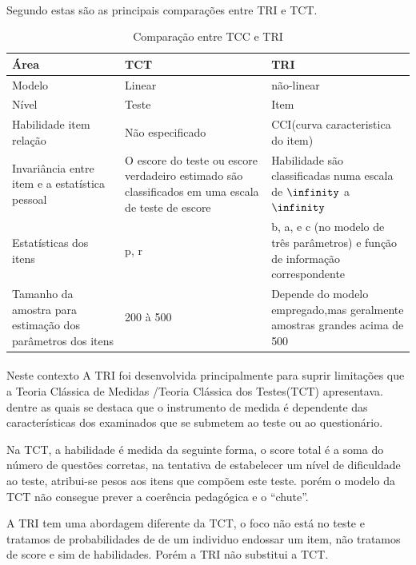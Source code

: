	\paragraph{}
	    Segundo \textcite{Ronald} estas são as principais comparações entre TRI e TCT.
	\begin{table}[!h]
	    \centering
	  
	    \begin{tabular}{|p{4cm}|p{4cm}|p{4cm}|}
	        \hline
	         Área & TCT & TRI \\
	         \hline
	         \hline
	         Modelo & Linear & não-linear\\
	         \hline
	         Nível & Teste & Item \\
	         \hline
	         Habilidade item relação & Não especificado & CCI(curva caracteristica do item)\\
	         \hline
	         Invariância entre item e a estatística pessoal & 
	         O escore do teste ou escore verdadeiro estimado são classificados em uma escala de teste de escore &
	         Habilidade são classificadas numa escala de $\infinity$ a $\infinity$ \\
	         \hline
	         Estatísticas dos itens & p, r & b, a, e c (no modelo de três parâmetros) e função de informação correspondente \\
	         \hline
	         Tamanho da amostra para estimação dos parâmetros dos itens & 200 à 500 & Depende do modelo empregado,mas geralmente amostras grandes acima de 500\\
	         \hline
	    \end{tabular}
	     \caption{Comparação entre TCC e TRI}
	     \label{tab:comparacao}
	\end{table}
	  
	\paragraph{}
	    Neste contexto A TRI foi desenvolvida principalmente para suprir limitações que a Teoria Clássica de Medidas /Teoria Clássica dos Testes(TCT) apresentava. dentre as quais se destaca que o instrumento de medida é dependente das características dos examinados que se submetem ao teste ou ao questionário.
	\par
	    Na TCT, a habilidade é medida da seguinte forma, o score total é a soma do número de questões corretas, na tentativa de estabelecer um nível de dificuldade ao teste, atribui-se pesos aos itens que compõem este teste. porém o modelo da TCT não consegue prever a coerência pedagógica e o “chute”.
	\par
	    A TRI tem uma abordagem diferente da TCT, o foco não está no teste e tratamos de probabilidades de de um individuo endossar um item, não tratamos de score e sim de habilidades. Porém a TRI não substitui a TCT.
		
